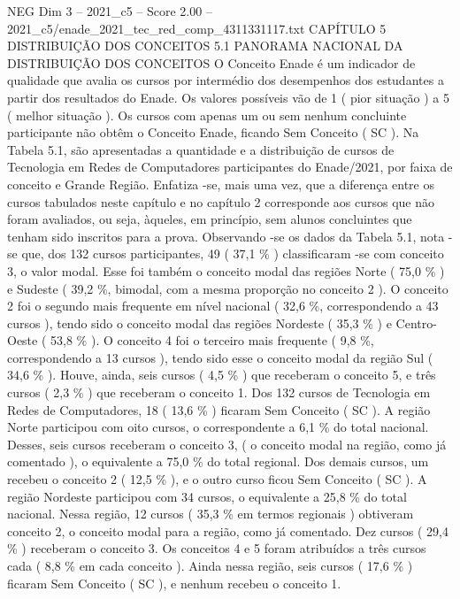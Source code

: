 \begin{textsample}{NEG Dim 3 – 2021\_c5 – Score 2.00 – 2021\_c5/enade\_2021\_tec\_red\_comp\_4311331117.txt}  \label{ex:f3_neg_202}
CAPÍTULO 5 DISTRIBUIÇÃO DOS CONCEITOS 5.1 PANORAMA NACIONAL DA DISTRIBUIÇÃO DOS CONCEITOS O Conceito Enade é um indicador de qualidade que avalia os cursos por intermédio dos desempenhos dos estudantes a partir dos resultados do Enade.
Os valores possíveis vão de 1 ( pior situação ) a 5 ( melhor situação ).
Os cursos com apenas um ou sem nenhum concluinte participante não obtêm o Conceito Enade, ficando Sem Conceito ( SC ).
Na Tabela 5.1, são apresentadas a quantidade e a distribuição de cursos de Tecnologia em Redes de Computadores participantes do Enade/2021, por faixa de conceito e Grande Região.
Enfatiza -se, mais uma vez, que a diferença entre os cursos tabulados neste capítulo e no capítulo 2 corresponde aos cursos que não foram avaliados, ou seja, àqueles, em princípio, sem alunos concluintes que tenham sido inscritos para a prova.
Observando -se os dados da Tabela 5.1, nota -se que, dos 132 cursos participantes, 49 ( 37,1 \% ) classificaram -se com conceito 3, o valor modal.
Esse foi também o conceito modal das regiões Norte ( 75,0 \% ) e Sudeste ( 39,2 \%, bimodal, com a mesma proporção no conceito 2 ).
O conceito 2 foi o segundo mais frequente em nível nacional ( 32,6 \%, correspondendo a 43 cursos ), tendo sido o conceito modal das regiões Nordeste ( 35,3 \% ) e Centro-Oeste ( 53,8 \% ).
O conceito 4 foi o terceiro mais frequente ( 9,8 \%, correspondendo a 13 cursos ), tendo sido esse o conceito modal da região Sul ( 34,6 \% ).
Houve, ainda, seis cursos ( 4,5 \% ) que receberam o conceito 5, e três cursos ( 2,3 \% ) que receberam o conceito 1.
Dos 132 cursos de Tecnologia em Redes de Computadores, 18 ( 13,6 \% ) ficaram Sem Conceito ( SC ).
A região Norte participou com oito cursos, o correspondente a 6,1 \% do total nacional.
Desses, seis cursos receberam o conceito 3, ( o conceito modal na região, como já comentado ), o equivalente a 75,0 \% do total regional.
Dos demais cursos, um recebeu o conceito 2 ( 12,5 \% ), e o outro curso ficou Sem Conceito ( SC ).
A região Nordeste participou com 34 cursos, o equivalente a 25,8 \% do total nacional.
Nessa região, 12 cursos ( 35,3 \% em termos regionais ) obtiveram conceito 2, o conceito modal para a região, como já comentado.
Dez cursos ( 29,4 \% ) receberam o conceito 3.
Os conceitos 4 e 5 foram atribuídos a três cursos cada ( 8,8 \% em cada conceito ).
Ainda nessa região, seis cursos ( 17,6 \% ) ficaram Sem Conceito ( SC ), e nenhum recebeu o conceito 1.

\end{textsample}
